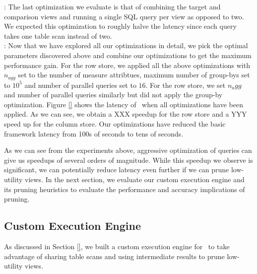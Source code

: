 :
The last optimization we evaluate is that of combining the target and comparison
views and running a single SQL query per view as opposed to two.
We expected this optimization to roughly halve the latency since each query
takes one table scan instead of two.\\

:
Now that we have explored all our optimizations in detail, we pick the optimal
parameters discovered above and combine our optimizations to get the maximum
performance gain.
For the row store, we applied all the above optimizations with $n_{agg}$ set to
the number of measure attribtues, maximum number of group-bys set to $10^5$ and
number of parallel queries set to $16$.
For the row store, we set $n_a{gg}$ and number of parallel queries similarly but
did not apply the group-by optimization. 
Figure \ref{} shows the latency of
\VizRecDB\ when all optimizations have been applied.
As we can see, we obtain a XXX speedup for the row store and a YYY speed up for
the column store.
Our optimizations have reduced the basic framework latency from 100s of seconds
to tens of seconds.

As we can see from the experiments above, aggressive optimization of queries can
give us speedups of several orders of magnitude.
While this speedup we observe is significant, we can potentially reduce latency
even further if we can prune low-utility views.
In the next section, we evaluate our custom execution engine and its pruning
heuristics to evaluate the performance and accuracy implications of pruning.

\subsection{Custom Execution Engine}
\label{sec:custom_execution_engine}

As discussed in Section \ref{}, we built a custom execution engine for
\VizRecDB\ to take advantage of sharing table scans and using intermediate
results to prune low-utility views.

